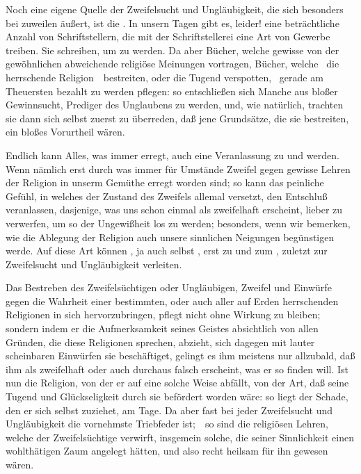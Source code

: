 \begin{aufza}
\begin{aufzb}
\end{aufzb}
\item Noch eine eigene Quelle der Zweifelsucht und Ungläubigkeit, die sich besonders bei  zuweilen äußert, ist die . In unsern Tagen gibt es, leider! eine beträchtliche Anzahl von Schriftstellern, die mit der Schriftstellerei eine Art von Gewerbe treiben. Sie schreiben, um  zu werden. Da aber Bücher, welche gewisse von der gewöhnlichen abweichende religiöse Meinungen vortragen, Bücher, welche \zB\ die herrschende Religion~\ bestreiten, oder die Tugend verspotten, \udgl\ gerade am Theuersten bezahlt zu werden pflegen: so entschließen sich Manche aus bloßer Gewinnsucht, Prediger des Unglaubens zu werden, und, wie natürlich, trachten sie dann sich selbst zuerst zu überreden, daß jene Grundsätze, die sie bestreiten, ein bloßes Vorurtheil wären.
\item Endlich kann Alles, was immer  erregt, auch eine Veranlassung zu  und  werden. Wenn nämlich erst durch was immer für Umstände Zweifel gegen gewisse Lehren der Religion in unserm Gemüthe erregt worden sind; so kann das peinliche Gefühl, in welches der Zustand des Zweifels allemal versetzt, den Entschluß veranlassen, dasjenige, was uns schon einmal als zweifelhaft erscheint, lieber  zu verwerfen, um so der Ungewißheit los zu werden; besonders, wenn wir bemerken, wie die Ablegung der Religion auch unsere sinnlichen Neigungen begünstigen werde. Auf diese Art können , ja auch selbst , erst zu  und zum , zuletzt zur Zweifelsucht und Ungläubigkeit verleiten.
\end{aufza}

Das Bestreben des Zweifelsüchtigen oder Ungläubigen, Zweifel und Einwürfe gegen die Wahrheit einer bestimmten, oder auch aller auf Erden herrschenden Religionen in sich hervorzubringen, pflegt nicht ohne Wirkung zu bleiben; sondern indem er die Aufmerksamkeit seines Geistes absichtlich von allen Gründen, die  diese Religionen sprechen, abzieht, sich dagegen mit lauter scheinbaren Einwürfen  sie beschäftiget, gelingt es ihm meistens nur allzubald, daß ihm als zweifelhaft oder auch durchaus falsch erscheint, was er so finden will. Ist nun die Religion, von der er auf eine solche Weise abfällt, von der Art, daß seine Tugend und Glückseligkeit durch sie befördert worden wäre: so liegt der Schade, den er sich selbst zuziehet, am Tage. Da aber fast bei jeder Zweifelsucht und Ungläubigkeit die vornehmste Triebfeder  ist;~\ so sind die religiösen Lehren, welche der Zweifelsüchtige verwirft, insgemein solche, die seiner Sinnlichkeit einen wohlthätigen Zaum angelegt hätten, und also recht heilsam für ihn gewesen wären.

